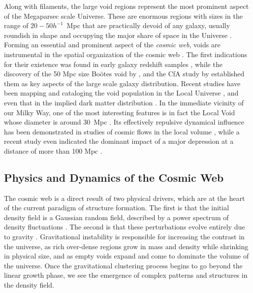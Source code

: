 Along with filaments, the large void regions represent the most prominent aspect of the Megaparsec scale Universe. These are enormous regions 
with sizes in the range of $20-50h^{-1}$~Mpc that are practically devoid of any galaxy, usually roundish in shape and occupying the major 
share of space in the Universe \citep[see][for a recent review]{Iau308}.  Forming an essential and prominent aspect of the 
{\it cosmic web}, voids are instrumental in the spatial organization of the cosmic web \citep{Icke1984,Sahni1994,
Sheth2003b,Aragon-Calvo2012}. The first indications for their existence was found in early galaxy redshift samples 
\citep{Gregory1978,Zeldovich1982}, while the discovery of the 50 Mpc size Bo\"otes void by \cite{Kirshner1981}, \cite{Kirshner1987} 
and the CfA study by \cite{Lapparent1986} established them as key aspects of the large scale galaxy distribution. Recent studies have 
been mapping and cataloging the void population in the Local Universe \citep{Pan2012,Sutter2012}, and even that in the implied dark 
matter distribution \citep{Leclercq2015b}. In the immediate vicinity of our Milky Way, one of the most interesting features 
is in fact the Local Void whose diameter is around 30~Mpc \citep{Tully1987}. Its effectively repulsive dynamical influence 
has been demonstrated in studies of cosmic flows in the local volume \citep{Tully2008}, while a recent study even indicated the 
dominant impact of a major depression at a distance of more than 100 Mpc \citep[the so-called ``dipole repeller'',][]{Hoffman2017}. 

\subsection{Physics and Dynamics of the Cosmic Web}
The cosmic web is a direct result of two physical drivers, which are at the heart of the current paradigm of structure formation. 
The first is that the initial density field is a Gaussian random field, described by a power spectrum of density fluctuations \citep{Adler1981,bbks}. The second is that these perturbations evolve entirely due to gravity \citep{Peebles1980}. Gravitational instability is responsible 
for increasing the contrast in the universe, as rich over-dense regions grow in mass and density while shrinking in physical size, and as empty 
voids expand and come to dominate the volume of the universe. Once the gravitational clustering process begins to go beyond the 
linear growth phase, we see the emergence of complex patterns and structures in the density field. 


